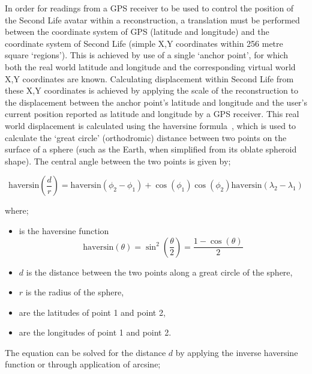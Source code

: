 
In order for readings from a GPS receiver to be used to control the position of the Second Life avatar within a reconstruction, a translation must be performed between the coordinate system of GPS (latitude and longitude) and the coordinate system of Second Life (simple X,Y coordinates within 256 metre square `regions'). This is achieved by use of a single `anchor point', for which both the real world latitude and longitude and the corresponding virtual world X,Y coordinates are known. Calculating displacement within Second Life from these X,Y coordinates is achieved by applying the scale of the reconstruction to the displacement between the anchor point's latitude and longitude and the user's current position reported as latitude and longitude by a GPS receiver. This real world displacement is calculated using the haversine formula~\cite{VanBrummelen2012}, which is used to calculate the `great circle' (orthodromic) distance between two points on the surface of a sphere (such as the Earth, when simplified from its oblate spheroid shape). The central angle  between the two points is given by;

\begin{equation}
\label{haversine1}
\text{haversin}\left(\frac{d}{r}\right) = \text{haversin}(\phi_{2}-\phi_{1})+\cos(\phi_{1})\cos(\phi_{2})\text{haversin}(\lambda_{2}-\lambda_{1})
\end{equation}

where;

\begin{itemize}
	\item {} is the haversine function
		\begin{equation}
		\label{harsine2}
			\text{haversin}(\theta) = \sin^{2}\left( \frac{\theta}{2}\right) = \frac{1-\cos(\theta)}{2}
		\end{equation}
	\item $d$ is the distance between the two points along a great circle of the sphere,
	\item $r$ is the radius of the sphere,
	\item {} are the latitudes of point 1 and point 2,
	\item {} are the longitudes of point 1 and point 2.
\end{itemize}

The equation can be solved for the distance $d$ by applying the inverse haversine function or through application of arcsine;

